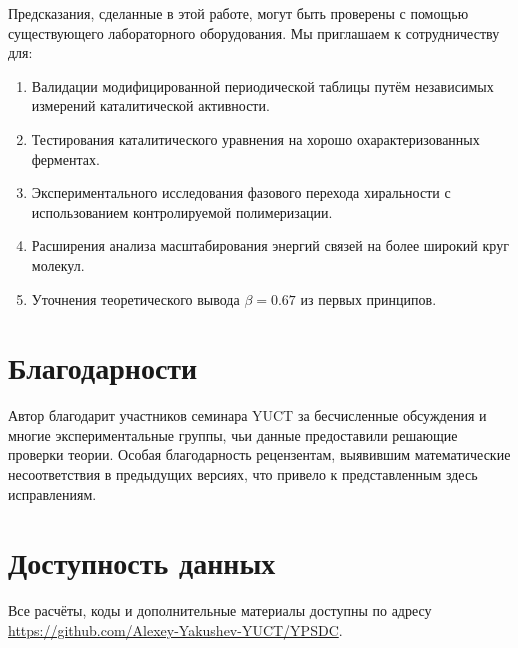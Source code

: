 \documentclass[12pt,a4paper]{article}
\theoremstyle{remark}
\begin{document}
	Предсказания, сделанные в этой работе, могут быть проверены с помощью существующего лабораторного оборудования. Мы приглашаем к сотрудничеству для:
	\begin{enumerate}
		\item Валидации модифицированной периодической таблицы путём независимых измерений каталитической активности.
		\item Тестирования каталитического уравнения на хорошо охарактеризованных ферментах.
		\item Экспериментального исследования фазового перехода хиральности с использованием контролируемой полимеризации.
		\item Расширения анализа масштабирования энергий связей на более широкий круг молекул.
		\item Уточнения теоретического вывода $\beta = 0.67$ из первых принципов.
	\end{enumerate}
	
	\section*{Благодарности}
	
	Автор благодарит участников семинара YUCT за бесчисленные обсуждения и многие экспериментальные группы, чьи данные предоставили решающие проверки теории. Особая благодарность рецензентам, выявившим математические несоответствия в предыдущих версиях, что привело к представленным здесь исправлениям.
	
	\section*{Доступность данных}
	
	Все расчёты, коды и дополнительные материалы доступны по адресу \url{https://github.com/Alexey-Yakushev-YUCT/YPSDC}.
	
\end{document}
